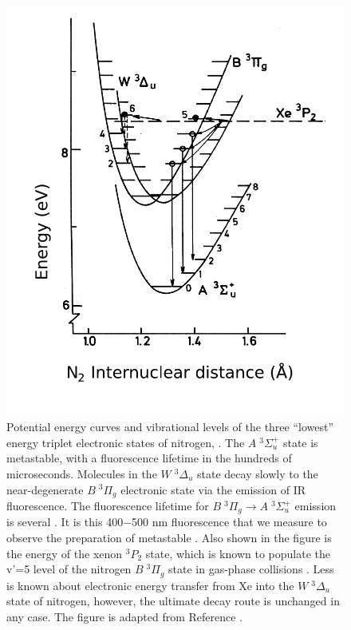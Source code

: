 \begin{figure}
  \caption{Potential energy curves and vibrational levels of the three
    ``lowest'' energy triplet electronic states of nitrogen, .
    The $A \; ^3\Sigma_u^+$ state is metastable, with a fluorescence
    lifetime in the hundreds of microseconds.  Molecules in the $W \;
    ^3\Delta_u$ state decay slowly to the near-degenerate $B \;
    ^3\Pi_g$ electronic state via the emission of IR fluorescence.
    The fluorescence lifetime for $B \; ^3\Pi_g \rightarrow A \;
    ^3\Sigma_u^+$ emission is several \microsec. It is this 400$-$500
    nm fluorescence that we measure to observe the preparation of
    metastable .  Also shown in the figure is the energy of the
    xenon $^3P_2$ state, which is known to populate the v'=5 level of
    the nitrogen $B \; ^3\Pi_g$ state in gas-phase collisions
    \cite{krumpelmann87}.  Less is known about electronic energy
    transfer from Xe into the $W \; ^3\Delta_u$ state of nitrogen,
    however, the ultimate decay route is unchanged in any case.  The
    figure is adapted from Reference \cite{krumpelmann-thesis}.}
  \label{fig:n2curves}
  \centering
  \includegraphics[width=5in]{n2curves.pdf}
\end{figure}

